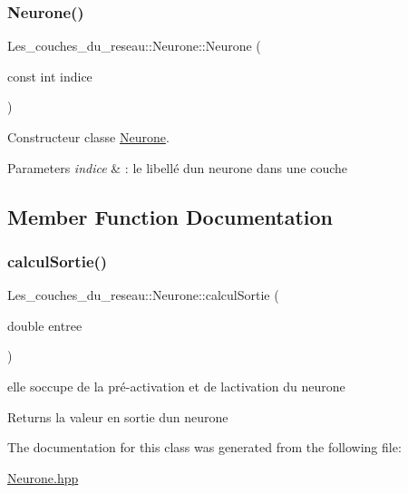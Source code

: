 \subsubsection{\texorpdfstring{Neurone()}{Neurone()}}
{\footnotesize\ttfamily Les\+\_\+couches\+\_\+du\+\_\+reseau\+::\+Neurone\+::\+Neurone (\begin{DoxyParamCaption}\item[{const int}]{indice }\end{DoxyParamCaption})}



Constructeur classe \hyperlink{class_les__couches__du__reseau_1_1_neurone}{Neurone}. 


\begin{DoxyParams}{Parameters}
{\em indice} & \+: le libellé d\textquotesingle{}un neurone dans une couche \\
\hline
\end{DoxyParams}


\subsection{Member Function Documentation}
\mbox{\label{class_les__couches__du__reseau_1_1_neurone_a05325684bcf9f4f042b4bf9ce8415afc}} 
\subsubsection{\texorpdfstring{calcul\+Sortie()}{calculSortie()}}
{\footnotesize\ttfamily Les\+\_\+couches\+\_\+du\+\_\+reseau\+::\+Neurone\+::calcul\+Sortie (\begin{DoxyParamCaption}\item[{double}]{entree }\end{DoxyParamCaption})}



elle s\textquotesingle{}occupe de la pré-\/activation et de l\textquotesingle{}activation du neurone 

\begin{DoxyReturn}{Returns}
la valeur en sortie d\textquotesingle{}un neurone 
\end{DoxyReturn}


The documentation for this class was generated from the following file\+:\begin{DoxyCompactItemize}
\item 
\hyperlink{_neurone_8hpp}{Neurone.\+hpp}\end{DoxyCompactItemize}
